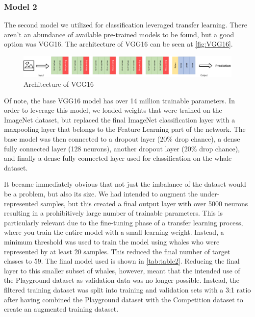 \documentclass[paper=a4, fontsize=11pt]{scrartcl}
\numberwithin{equation}{section}		%
\numberwithin{table}{section}				%
\begin{document}
\subsubsection{Model 2}

The second model we utilized for classification leveraged transfer learning. There aren't an abundance of available pre-trained models to be found, but a good option was VGG16. The architecture of VGG16 can be seen at \autoref{fig:VGG16}.

\begin{figure}[!h]
    \centering
    \includegraphics[width=1\textwidth]{VGG16.png}
    \caption{Architecture of VGG16}
    \label{fig:VGG16}
\end{figure}

Of note, the base VGG16 model has over 14 million trainable parameters. In order to leverage this model, we loaded weights that were trained on the ImageNet dataset, but replaced the final ImageNet classification layer with a maxpooling layer that belongs to the Feature Learning part of the network. The base model was then connected to a dropout layer (20\% drop chance), a dense fully connected layer (128 neurons), another dropout layer (20\% drop chance), and finally a dense fully connected layer used for classification on the whale dataset. 

It became immediately obvious that not just the imbalance of the dataset would be a problem, but also its size. We had intended to augment the under-represented samples, but this created a final output layer with over 5000 neurons resulting in a prohibitively large number of trainable parameters. This is particularly relevant due to the fine-tuning phase of a transfer learning process, where you train the entire model with a small learning weight. Instead, a minimum threshold was used to train the model using whales who were represented by at least 20 samples. This reduced the final number of target classes to 59. The final model used is shown in \autoref{tab:table2}. Reducing the final layer to this smaller subset of whales, however, meant that the intended use of the Playground dataset as validation data was no longer possible. Instead, the filtered training dataset was split into training and validation sets with a 3:1 ratio after having combined the Playground dataset with the Competition dataset to create an augmented training dataset.
\end{document}
